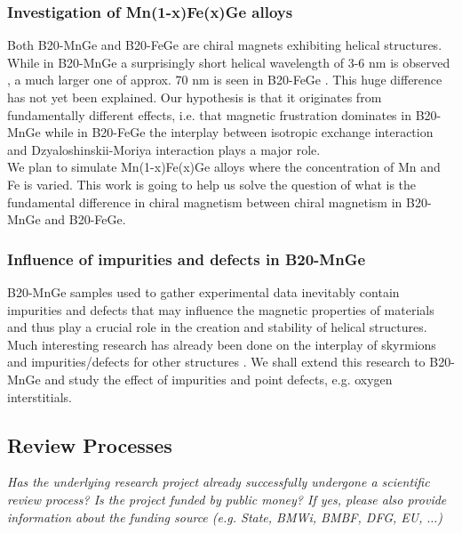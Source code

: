 \documentclass [a4paper, 12pt]{article}
\begin{document}
\subsubsection{Investigation of Mn(1-x)Fe(x)Ge alloys}
Both B20-MnGe and B20-FeGe are chiral magnets exhibiting helical structures. While in
B20-MnGe a surprisingly short helical wavelength of 3-6 nm is observed \cite{tanigaki_real-space_2015},
a much larger one of
approx. 70 nm is seen in B20-FeGe \cite{lebech_magnetic_1989}. This huge difference has not yet been explained.
Our hypothesis is that it originates from fundamentally different effects, i.e. that
magnetic frustration dominates in B20-MnGe while in B20-FeGe the interplay between
isotropic exchange interaction and Dzyaloshinskii-Moriya interaction plays a major role.
\\
We plan to
simulate Mn(1-x)Fe(x)Ge alloys where the concentration of Mn and Fe is varied.
This work is going to help us solve the question of what is the fundamental difference in chiral magnetism
between
chiral magnetism in B20-MnGe and B20-FeGe.

\subsubsection{Influence of impurities and defects in B20-MnGe}
B20-MnGe samples used to gather experimental data inevitably contain impurities and defects 
that may influence the magnetic properties of materials and thus play a crucial role
in the creation and stability of helical structures.
Much interesting research has already been done on the interplay of
skyrmions and impurities/defects for other structures
\cite{fert_skyrmions_2013,woo_observation_2016,jiang_direct_2016,crum_perpendicular_2015}.
We shall extend this research to B20-MnGe and
study the effect of impurities and point defects, e.g. oxygen interstitials.

\subsection{Review Processes}
\textit{Has the underlying research project already successfully undergone a scientific review process? Is the project funded by public money?
If yes, please also provide information about the funding source
(e.g. State, BMWi, BMBF, DFG, EU, $\dots$)}
\end{document}
